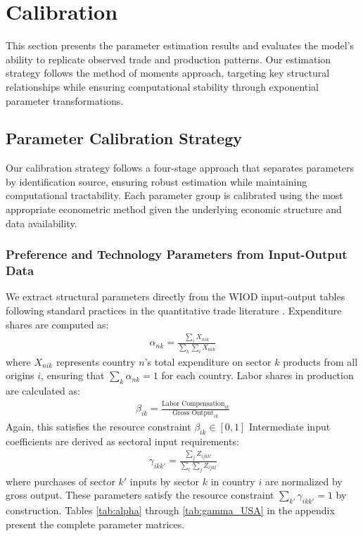 \section{Calibration}

This section presents the parameter estimation results and evaluates the model's ability to replicate observed trade and production patterns. Our estimation strategy follows the method of moments approach, targeting key structural relationships while ensuring computational stability through exponential parameter transformations.

\subsection{Parameter Calibration Strategy}

Our calibration strategy follows a four-stage approach that separates parameters by identification source, ensuring robust estimation while maintaining computational tractability. Each parameter group is calibrated using the most appropriate econometric method given the underlying economic structure and data availability. 

\subsubsection{Preference and Technology Parameters from Input-Output Data}

We extract structural parameters directly from the WIOD input-output tables following standard practices in the quantitative trade literature \citep{costinot2012TheReviewofEconomicStudies}. Expenditure shares are computed as:
\begin{align*}
\alpha_{nk} = \frac{\sum_i X_{nik}}{\sum_k \sum_i X_{nik}}
\end{align*}
where $X_{nik}$ represents country $n$'s total expenditure on sector $k$ products from all origins $i$, ensuring that $\sum_k \alpha_{nk} = 1$ for each country. Labor shares in production are calculated as:
\begin{align*}
\beta_{ik} = \frac{\text{Labor Compensation}_{ik}}{\text{Gross Output}_{ik}}
\end{align*}
Again, this satisfies the resource constraint $\beta_{ik} \in [0,1]$ Intermediate input coefficients are derived as sectoral input requirements:
\begin{align*}
\gamma_{ikk'} = \frac{\sum_j Z_{ijkk'}}{\sum_{l}\sum_j Z_{ijkl}}
\end{align*}
where purchases of sector $k'$ inputs by sector $k$ in country $i$ are normalized by gross output. These parameters satisfy the resource constraint $\sum_{k'} \gamma_{ikk'} = 1$ by construction. Tables \ref{tab:alpha} through \ref{tab:gamma_USA} in the appendix present the complete parameter matrices.

